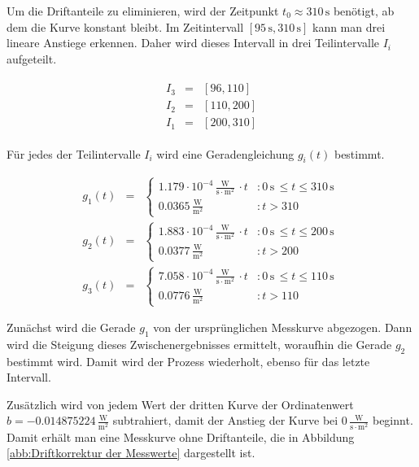 \documentclass[12pt,a4paper]{scrartcl}
\numberwithin{equation}{section} %
\begin{document}
Um die Driftanteile zu eliminieren, wird der Zeitpunkt $t_0\approx310\mathrm{\,s}$ benötigt, ab dem die Kurve konstant bleibt. Im Zeitintervall $[95\mathrm{\,s}, 310\mathrm{\,s}]$ kann man drei lineare Anstiege erkennen. Daher wird dieses Intervall in drei Teilintervalle $I_i$ aufgeteilt.

\begin{eqnarray}
	\begin{split}
		I_3 &=& [96,110] \\
		I_2 &=& [110,200] \\
		I_1 &=& [200,310]
	\end{split}
\end{eqnarray}

\noindent
Für jedes der Teilintervalle $I_i$ wird eine Geradengleichung $g_i(t)$ bestimmt.

\begin{eqnarray}
	g_1(t) &=&
	\begin{cases}
		1.179 \cdot 10^{-4} \mathrm{\,\frac{W}{s\cdot m^2}\,} \cdot t &: 0\mathrm{\,s\,}\leq t \leq 310 \mathrm{\,s\,} \\
		0.0365 \mathrm{\,\frac{W}{m^2}} &: t > 310
	\end{cases} \\
	g_2(t) &=&
	\begin{cases}
		1.883 \cdot 10^{-4} \mathrm{\,\frac{W}{s\cdot m^2}\,} \cdot t &: 0\mathrm{\,s\,}\leq t \leq 200 \mathrm{\,s\,} \\
		0.0377 \mathrm{\,\frac{W}{m^2}} &: t > 200
	\end{cases} \\
	g_3(t) &=&
	\begin{cases}
		7.058\cdot 10^{-4} \mathrm{\,\frac{W}{s\cdot m^2}\,} \cdot t &: 0\mathrm{\,s\,}\leq t \leq 110 \mathrm{\,s\,} \\
		0.0776 \mathrm{\,\frac{W}{m^2}} &: t > 110
	\end{cases}
\end{eqnarray}

\noindent
Zunächst wird die Gerade $g_1$ von der ursprünglichen Messkurve abgezogen. Dann wird die Steigung dieses Zwischenergebnisses ermittelt, woraufhin die Gerade $g_2$ bestimmt wird. Damit wird der Prozess wiederholt, ebenso für das letzte Intervall.

Zusätzlich wird von jedem Wert der dritten Kurve der Ordinatenwert $b=-0.014875224 \mathrm{\,\frac{W}{m^2}}$ subtrahiert, damit der Anstieg der Kurve bei $0\mathrm{\,\frac{W}{s\cdot m^2}}$ beginnt. Damit erhält man eine Messkurve ohne Driftanteile, die in Abbildung \ref{abb:Driftkorrektur der Messwerte} dargestellt ist.
\end{document}
